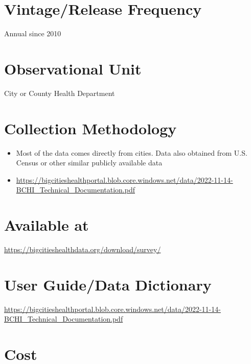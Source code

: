\documentclass[
]{book}
\providecommand{\tightlist}{%
  \setlength{\itemsep}{0pt}\setlength{\parskip}{0pt}}
\begin{document}
\hypertarget{vintagerelease-frequency-13}{%
\section{Vintage/Release Frequency}\label{vintagerelease-frequency-13}}

Annual since 2010

\hypertarget{observational-unit-13}{%
\section{Observational Unit}\label{observational-unit-13}}

City or County Health Department

\hypertarget{collection-methodology-13}{%
\section{Collection Methodology}\label{collection-methodology-13}}

\begin{itemize}
\tightlist
\item
  Most of the data comes directly from cities. Data also obtained from U.S. Census or other similar publicly available data
\item
  \url{https://bigcitieshealthportal.blob.core.windows.net/data/2022-11-14-BCHI_Technical_Documentation.pdf}
\end{itemize}

\hypertarget{available-at-13}{%
\section{Available at}\label{available-at-13}}

\url{https://bigcitieshealthdata.org/download/survey/}

\hypertarget{user-guidedata-dictionary-13}{%
\section{User Guide/Data Dictionary}\label{user-guidedata-dictionary-13}}

\url{https://bigcitieshealthportal.blob.core.windows.net/data/2022-11-14-BCHI_Technical_Documentation.pdf}

\hypertarget{cost-13}{%
\section{Cost}\label{cost-13}}
\end{document}
